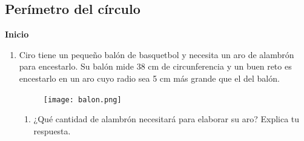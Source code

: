 \documentclass[11pt]{book}
\begin{document}
\subsection{Perímetro del círculo}

\begin{boxK}
  \begin{center}\textbf{Inicio}\end{center}

  \begin{enumerate}
    \item Ciro tiene un pequeño balón de basquetbol y necesita un aro de alambrón para encestarlo.
          Su balón mide 38 cm de circunferencia y un buen
          reto es encestarlo en un aro cuyo radio sea 5 cm más grande que el del
          balón.
          \begin{figure}[H]
            \centering
            \texttt{[image: balon.png]}
            \label{fig:balon}
          \end{figure}
          \begin{enumerate}
            \item ¿Qué cantidad de alambrón necesitará para elaborar su aro? Explica tu respuesta.
          \end{enumerate}
  \end{enumerate}
\end{boxK}
\end{document}

